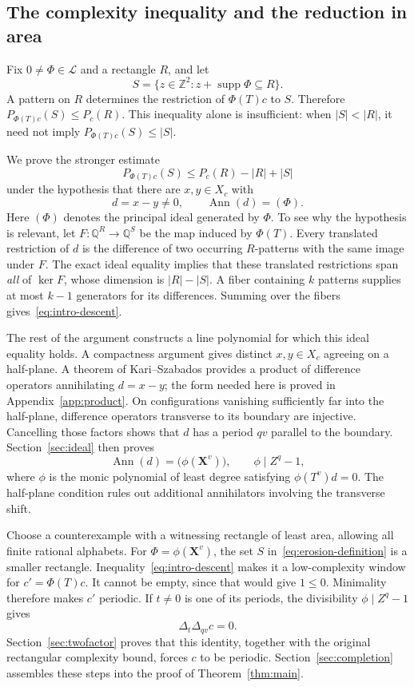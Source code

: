 \documentclass[11pt,a4paper,reqno]{amsart}
\theoremstyle{remark}
\newcommand{\Z}{\mathbb Z}
\newcommand{\Q}{\mathbb Q}
\newcommand{\LL}{\mathcal L}
\newcommand{\mon}[1]{\boldsymbol X^{#1}}
\newcommand{\De}{\Delta}
\DeclareMathOperator{\Ann}{Ann}
\DeclareMathOperator{\supp}{supp}
\numberwithin{equation}{section}
\begin{document}
\subsection{The complexity inequality and the reduction in area}
Fix $0\ne\Phi\in\LL$ and a rectangle $R$, and let
\begin{equation}\label{eq:erosion-definition}
 S=\{z\in\Z^2:z+\supp\Phi\subseteq R\}.
\end{equation}
A pattern on $R$ determines the restriction of $\Phi(T)c$ to $S$. Therefore
$P_{\Phi(T)c}(S)\le P_c(R)$. This inequality alone is insufficient: when $|S|<|R|$, it need not imply $P_{\Phi(T)c}(S)\le|S|$.

We prove the stronger estimate
\begin{equation}\label{eq:intro-descent}
 P_{\Phi(T)c}(S)\le P_c(R)-|R|+|S|
\end{equation}
under the hypothesis that there are $x,y\in X_c$ with
\[
 d=x-y\ne0,\qquad \Ann(d)=(\Phi).
\]
Here $(\Phi)$ denotes the principal ideal generated by $\Phi$. To see why the hypothesis is relevant, let $F:\Q^R\to\Q^S$ be the map induced by $\Phi(T)$. Every translated restriction of $d$ is the difference of two occurring $R$-patterns with the same image under $F$. The exact ideal equality implies that these translated restrictions span \emph{all} of $\ker F$, whose dimension is $|R|-|S|$. A fiber containing $k$ patterns supplies at most $k-1$ generators for its differences. Summing over the fibers gives~\eqref{eq:intro-descent}.

The rest of the argument constructs a line polynomial for which this ideal equality holds. A compactness argument gives distinct $x,y\in X_c$ agreeing on a half-plane. A theorem of Kari--Szabados provides a product of difference operators annihilating $d=x-y$; the form needed here is proved in Appendix~\ref{app:product}. On configurations vanishing sufficiently far into the half-plane, difference operators transverse to its boundary are injective. Cancelling those factors shows that $d$ has a period $qv$ parallel to the boundary. Section~\ref{sec:ideal} then proves
\[
 \Ann(d)=\bigl(\phi(\mon v)\bigr),\qquad \phi\mid Z^q-1,
\]
where $\phi$ is the monic polynomial of least degree satisfying $\phi(T^v)d=0$. The half-plane condition rules out additional annihilators involving the transverse shift.

Choose a counterexample with a witnessing rectangle of least area, allowing all finite rational alphabets. For $\Phi=\phi(\mon v)$, the set $S$ in~\eqref{eq:erosion-definition} is a smaller rectangle. Inequality~\eqref{eq:intro-descent} makes it a low-complexity window for $c'=\Phi(T)c$. It cannot be empty, since that would give $1\le0$. Minimality therefore makes $c'$ periodic. If $t\ne0$ is one of its periods, the divisibility $\phi\mid Z^q-1$ gives
\[
 \De_t\De_{qv}c=0.
\]
Section~\ref{sec:twofactor} proves that this identity, together with the original rectangular complexity bound, forces $c$ to be periodic. Section~\ref{sec:completion} assembles these steps into the proof of Theorem~\ref{thm:main}.
\end{document}
